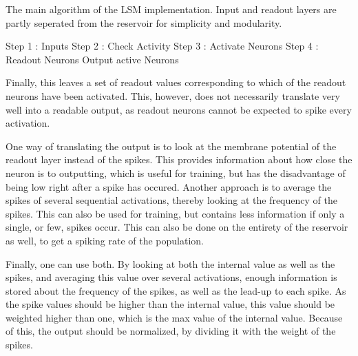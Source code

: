 \begin{algorithm}
\caption{The main algorithm of the LSM implementation. Input and readout layers are partly seperated from the reservoir for simplicity and modularity.}
\label{Alg:activation}
	Step 1 : Inputs\;
	Step 2 : Check Activity\;
	Step 3 : Activate Neurons\;
	Step 4 : Readout Neurons\;
	Output active Neurons\;
\end{algorithm}

Finally, this leaves a set of readout values corresponding to which of the readout neurons have been activated. This, however, does not necessarily translate very well into a readable output, as readout neurons cannot be expected to spike every activation.

One way of translating the output is to look at the membrane potential of the readout layer instead of the spikes. This provides information about how close the neuron is to outputting, which is useful for training, but has the disadvantage of being low right after a spike has occured.
Another approach is to average the spikes of several sequential activations, thereby looking at the frequency of the spikes. This can also be used for training, but contains less information if only a single, or few, spikes occur. This can also be done on the entirety of the reservoir as well, to get a spiking rate of the population.

Finally, one can use both. By looking at both the internal value as well as the spikes, and averaging this value over several activations, enough information is stored about the frequency of the spikes, as well as the lead-up to each spike. As the spike values should be higher than the internal value, this value should be weighted higher than one, which is the max value of the internal value. Because of this, the output should be normalized, by dividing it with the weight of the spikes.

















